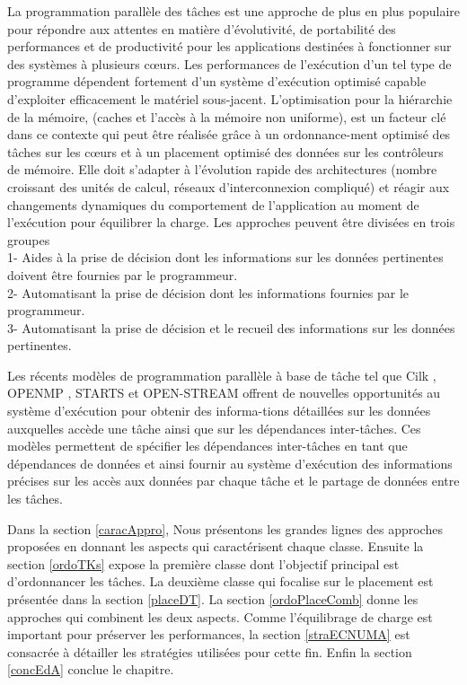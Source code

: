 La programmation parallèle des tâches est une approche de plus en plus populaire pour répondre aux attentes en matière d'évolutivité, de portabilité des performances et de productivité pour les applications destinées à fonctionner sur des systèmes à plusieurs cœurs. 
Les performances de l'exécution d'un tel type de programme dépendent fortement d'un système d'exécution optimisé capable d'exploiter efficacement le matériel sous-jacent. 
L'optimisation pour la hiérarchie de la mémoire, (caches et l'accès à la mémoire non uniforme), est un facteur clé dans ce contexte 
qui peut être réalisée grâce à un ordonnance-ment optimisé des tâches sur les cœurs et à un placement optimisé des données sur les contrôleurs de mémoire.   
Elle doit s'adapter à l'évolution rapide des architectures (nombre croissant des unités de calcul, réseaux d'interconnexion compliqué) et réagir aux changements dynamiques du comportement de l'application au moment de l'exécution pour équilibrer la charge.
Les approches peuvent être divisées en trois groupes \cite{Dreb15}\\
1- Aides à la prise de décision dont les informations sur les données pertinentes doivent être fournies par le programmeur.\\
2- Automatisant la prise de décision dont les informations fournies par le programmeur.\\
3- Automatisant la prise de décision et le recueil des informations sur les données pertinentes.

Les récents modèles de programmation parallèle à base de tâche tel que Cilk \cite{Cil00} \cite{Cil01}, OPENMP \cite{Omp00} \cite{Omp01} \cite{Omp02}, STARTS \cite{Sta00} et OPEN-STREAM \cite{Ost00} offrent de nouvelles opportunités au système d'exécution pour obtenir des informa-tions détaillées sur les données auxquelles accède une tâche ainsi que sur les dépendances inter-tâches. Ces modèles permettent de spécifier les dépendances inter-tâches en tant que dépendances de données et 
ainsi fournir au système d'exécution des informations précises sur les accès aux données par chaque tâche et le partage de données entre les tâches.

Dans la section \ref{caracAppro}, Nous présentons les grandes lignes des approches proposées en donnant les aspects qui caractérisent chaque classe. 
Ensuite la section \ref{ordoTKs} expose la première classe dont l'objectif principal est d'ordonnancer les tâches.
La deuxième classe qui focalise sur le placement est présentée dans la section \ref{placeDT}.
La section \ref{ordoPlaceComb} donne les approches qui combinent les deux aspects.
Comme l'équilibrage de charge est important pour préserver les performances, la section \ref{straECNUMA} est consacrée à détailler les stratégies utilisées pour cette fin.
Enfin la section \ref{concEdA} conclue le chapitre.\\
